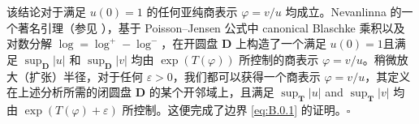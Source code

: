 该结论对于满足 \(u(0) = 1\) 的任何亚纯商表示 \(\varphi = v/u\) 均成立。Nevanlinna 的一个著名引理（参见 \cite[第 VII.1.4 节]{Nev70}），基于 Poisson--Jensen 公式中 canonical Blaschke 乘积以及对数分解 \(\log = \log^+ - \log^-\)，在开圆盘 \(\mathbf{D}\) 上构造了一个满足 \(u(0) = 1\)且满足 \(\sup_{\mathbf{D}} |u|\) 和 \(\sup_{\mathbf{D}} |v|\) 均由 \(\exp(T(\varphi))\) 所控制的商表示 \(\varphi = v/u\)。稍微放大（扩张）半径，对于任何 \(\varepsilon > 0\)，我们都可以获得一个商表示 \(\varphi = v/u\)，其定义在上述分析所需的闭圆盘 \(\mathbf{D}\) 的某个开邻域上，且满足 \(\sup_{\mathbf{T}} |u|\) and \(\sup_{\mathbf{T}} |v|\) 均由 \(\exp(T(\varphi) + \varepsilon)\) 所控制。这便完成了边界 \eqref{eq:B.0.1} 的证明。\(\square\)